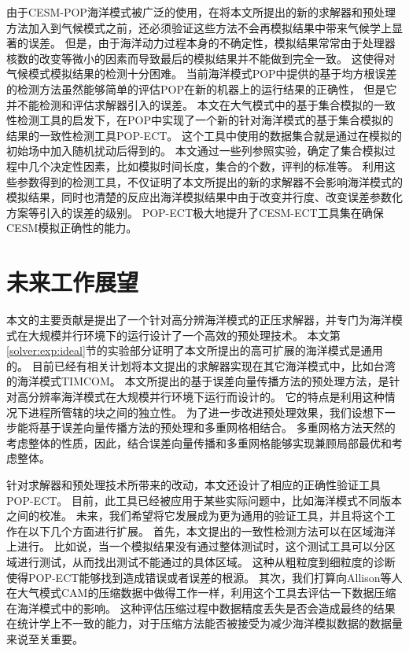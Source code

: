 由于CESM-POP海洋模式被广泛的使用，在将本文所提出的新的求解器和预处理方法加入到气候模式之前，还必须验证这些方法不会再模拟结果中带来气候学上显著的误差。 
但是，由于海洋动力过程本身的不确定性，模拟结果常常由于处理器核数的改变等微小的因素而导致最后的模拟结果并不能做到完全一致。
这使得对气候模式模拟结果的检测十分困难。
当前海洋模式POP中提供的基于均方根误差的检测方法虽然能够简单的评估POP在新的机器上的运行结果的正确性，
但是它并不能检测和评估求解器引入的误差。
本文在大气模式中的基于集合模拟的一致性检测工具的启发下，在POP中实现了一个新的针对海洋模式的基于集合模拟的结果的一致性检测工具POP-ECT。
这个工具中使用的数据集合就是通过在模拟的初始场中加入随机扰动后得到的。
本文通过一些列参照实验，确定了集合模拟过程中几个决定性因素，比如模拟时间长度，集合的个数，评判的标准等。
利用这些参数得到的检测工具，不仅证明了本文所提出的新的求解器不会影响海洋模式的模拟结果，同时也清楚的反应出海洋模拟结果中由于改变并行度、改变误差参数化方案等引入的误差的级别。 
POP-ECT极大地提升了CESM-ECT工具集在确保CESM模拟正确性的能力。


 
\section{未来工作展望}
\label{sec:futurework}

本文的主要贡献是提出了一个针对高分辨海洋模式的正压求解器，并专门为海洋模式在大规模并行环境下的运行设计了一个高效的预处理技术。
本文第\ref{solver:exp:ideal}节的实验部分证明了本文所提出的高可扩展的海洋模式是通用的。
目前已经有相关计划将本文提出的求解器实现在其它海洋模式中，比如台湾的海洋模式TIMCOM\cite{tseng2011parallel}。 
本文所提出的基于误差向量传播方法的预处理方法，是针对高分辨率海洋模式在大规模并行环境下运行而设计的。
它的特点是利用这种情况下进程所管辖的块之间的独立性。 为了进一步改进预处理效果，我们设想下一步能将基于误差向量传播方法的预处理和多重网格相结合。 
多重网格方法天然的考虑整体的性质，因此，结合误差向量传播和多重网格能够实现兼顾局部最优和考虑整体。


针对求解器和预处理技术所带来的改动，本文还设计了相应的正确性验证工具POP-ECT。
目前，此工具已经被应用于某些实际问题中，比如海洋模式不同版本之间的校准。
未来，我们希望将它发展成为更为通用的验证工具，并且将这个工作在以下几个方面进行扩展。 
首先，本文提出的一致性检测方法可以在区域海洋上进行。
比如说，当一个模拟结果没有通过整体测试时，这个测试工具可以分区域进行测试，从而找出测试不能通过的具体区域。 
这种从粗粒度到细粒度的诊断使得POP-ECT能够找到造成错误或者误差的根源。 
其次，我们打算向Allison等人\cite{baker2014methodology}在大气模式CAM的压缩数据中做得工作一样，利用这个工具去评估一下数据压缩在海洋模式中的影响。
这种评估压缩过程中数据精度丢失是否会造成最终的结果在统计学上不一致的能力，对于压缩方法能否被接受为减少海洋模拟数据的数据量来说至关重要。 



